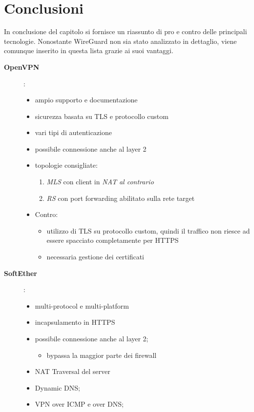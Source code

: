 \section{Conclusioni}
In conclusione del capitolo si fornisce un riassunto di pro e contro delle principali
tecnologie.
Nonostante WireGuard non sia stato analizzato
in dettaglio, viene comunque inserito in questa lista grazie ai suoi vantaggi.
\begin{description}
  \item[\textbf{OpenVPN}]:
  \begin{itemize}
    \item ampio supporto e documentazione
    \item sicurezza basata su TLS e protocollo custom
    \item vari tipi di autenticazione
    \item possibile connessione anche al layer 2
    \item topologie consigliate:
    \begin{enumerate}
      \item \textit{MLS} con client in \textit{NAT al contrario}
      \item \textit{RS} con port forwarding abilitato sulla rete target
    \end{enumerate}
    \item Contro:
    \begin{itemize}
      \item utilizzo di TLS su protocollo custom, quindi il traffico non riesce
      ad essere spacciato completamente per HTTPS
      \item necessaria gestione dei certificati
    \end{itemize}
  \end{itemize}
    \item[\textbf{SoftEther}]:
    \begin{itemize}
      \item multi-protocol e multi-platform
      \item incapsulamento in HTTPS
      \item possibile connessione anche al layer 2;
      \begin{itemize}
        \item bypassa la maggior parte dei firewall
      \end{itemize}
      \item NAT Traversal del server
      \item Dynamic DNS;
      \item VPN over ICMP e over DNS;

\end{itemize}
\end{description}
